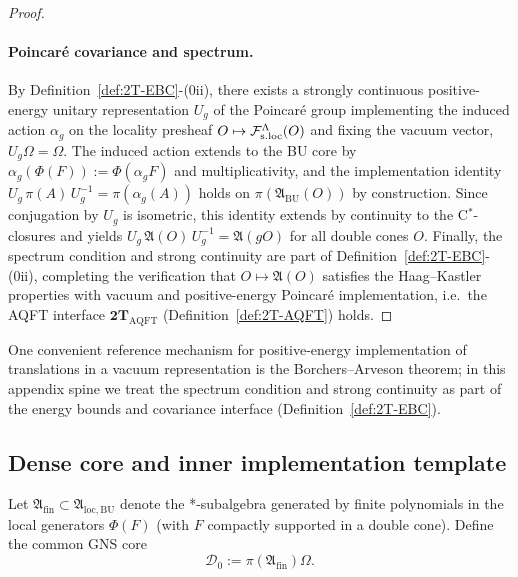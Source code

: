 \begin{proof}
\paragraph{Poincar\'e covariance and spectrum.}
By Definition~\ref{def:2T-EBC}-(0ii), there exists a strongly continuous
positive-energy unitary representation $U_g$ of the Poincar\'e group implementing
the induced action $\alpha_g$ on the locality presheaf $O\mapsto\mathcal F_{\mathrm{s.loc}}^\Lambda(O)$ and
fixing the vacuum vector, $U_g\Omega=\Omega$.
The induced action extends to the BU core by
$\alpha_g(\Phi(F)):=\Phi(\alpha_gF)$ and multiplicativity, and the
implementation identity
$
U_g\,\pi(A)\,U_g^{-1}=\pi(\alpha_g(A))
$
holds on $\pi(\mathfrak A_{\mathrm{BU}}(O))$ by construction. Since conjugation
by $U_g$ is isometric, this identity extends by continuity to the C$^*$-closures
and yields
$
U_g\,\mathfrak A(O)\,U_g^{-1}=\mathfrak A(gO)
$
for all double cones $O$.
Finally, the spectrum condition and strong continuity are part of
Definition~\ref{def:2T-EBC}-(0ii), completing the verification that
$O\mapsto\mathfrak A(O)$ satisfies the Haag--Kastler properties with vacuum and
positive-energy Poincar\'e implementation, i.e.\ the AQFT interface
$\mathbf{2T}_{\mathrm{AQFT}}$ (Definition~\ref{def:2T-AQFT}) holds.
\end{proof}

\begin{remark}
One convenient reference mechanism for positive-energy implementation of
translations in a vacuum representation is the Borchers--Arveson theorem; in
this appendix spine we treat the spectrum condition and strong continuity as
part of the energy bounds and covariance interface (Definition~\ref{def:2T-EBC}).
\end{remark}

\subsection{Dense core and inner implementation template}
\label{subsec:inner-implementation-template}

\begin{definition}
\label{def:A-fin}
Let $\mathfrak A_{\mathrm{fin}}\subset\mathfrak A_{\mathrm{loc,BU}}$ denote the
*-subalgebra generated by finite polynomials in the local generators
$\Phi(F)$ (with $F$ compactly supported in a double cone).  Define the common
GNS core
\[
\mathcal D_0 := \pi(\mathfrak A_{\mathrm{fin}})\Omega.
\]
\end{definition}

